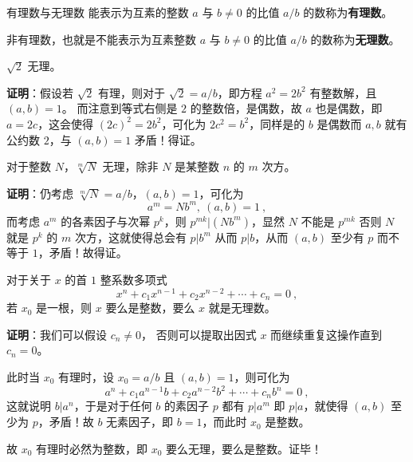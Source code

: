 
\begin{definition}{有理数与无理数}
能表示为互素的整数 $a$ 与 $b\neq 0$ 的比值 $a/b$ 的数称为\textbf{有理数}。

非有理数，也就是不能表示为互素整数 $a$ 与 $b\neq 0$ 的比值 $a/b$ 的数称为\textbf{无理数}。
\end{definition}

\begin{theorem}{}
$\sqrt{2}$ 无理。
\end{theorem}
\textbf{证明}：假设若 $\sqrt 2$ 有理，则对于 $\sqrt 2 = a/b$，即方程 $a^2=2b^2$ 有整数解，且 $(a, b) = 1$。
而注意到等式右侧是 $2$ 的整数倍，是偶数，故 $a$ 也是偶数，即 $a=2c$，这会使得 $(2c)^2 = 2b^2$，可化为 $2c^2=b^2$，同样是的 $b$ 是偶数而 $a, b$ 就有公约数 $2$，与 $(a, b) = 1$ 矛盾！得证。

\begin{theorem}{}
对于整数 $N$，$\sqrt[m]{N}$ 无理，除非 $N$ 是某整数 $n$ 的 $m$ 次方。
\end{theorem}
\textbf{证明}：仍考虑 $\sqrt[m]{N} = a/b$，$(a, b) = 1$，可化为
\begin{equation}
a^m = N b^m, ~ (a, b) = 1 ~,
\end{equation}
而考虑 $a^m$ 的各素因子与次幂 $p^k$，则 $p^{mk} | (Nb^m)$，显然 $N$ 不能是 $p^{mk}$ 否则 $N$ 就是 $p^k$ 的 $m$ 次方，这就使得总会有 $p | b^m$ 从而 $p|b$，从而 $(a, b)$ 至少有 $p$ 而不等于 $1$，矛盾！故得证。

\begin{theorem}{}
对于关于 $x$ 的首 $1$ 整系数多项式
\begin{equation}
x^n + c_1 x^{n-1} + c_2 x^{n-2} + \cdots + c_n = 0 ~,
\end{equation}
若 $x_0$ 是一根，则 $x$ 要么是整数，要么 $x$ 就是无理数。
\end{theorem}
\textbf{证明}：我们可以假设 $c_n \neq 0$， 否则可以提取出因式 $x$ 而继续重复这操作直到 $c_n = 0$。

此时当 $x_0$ 有理时，设 $x_0 = a/b$ 且 $(a , b) = 1$，则可化为
\begin{equation}
a^n + c_1 a^{n-1} b + c_2 a^{n-2} b^2 + \cdots +  c_nb^n = 0~,
\end{equation}
这就说明 $b | a^n$，于是对于任何 $b$ 的素因子 $p$ 都有 $p|a^m$ 即 $p | a$，就使得 $(a, b)$ 至少为 $p$，矛盾！故 $b$ 无素因子，即 $b = 1$，而此时 $x_0$ 是整数。

故 $x_0$ 有理时必然为整数，即 $x_0$ 要么无理，要么是整数。证毕！